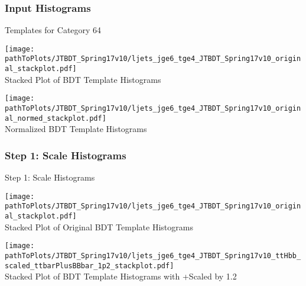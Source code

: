 \subsubsection{Input Histograms}
\begin{frame}{Templates for Category 64}

\begin{minipage}{0.48\textwidth}
\begin{center}
\texttt{[image: \\pathToPlots/JTBDT\_Spring17v10/ljets\_jge6\_tge4\_JTBDT\_Spring17v10\_original\_stackplot.pdf]}\label{fig::stackPlot64}\\
Stacked Plot of BDT Template Histograms

\end{center}
\end{minipage}
\begin{minipage}{0.48\textwidth}
\begin{center}
\texttt{[image: \\pathToPlots/JTBDT\_Spring17v10/ljets\_jge6\_tge4\_JTBDT\_Spring17v10\_original\_normed\_stackplot.pdf]}\label{fig::normed_stackPlot64}\\
Normalized BDT Template Histograms

\end{center}

\end{minipage}



\end{frame}

\subsubsection{Step 1: Scale Histograms}
\begin{frame}{Step 1: Scale Histograms}

\begin{minipage}{0.48\textwidth}
\begin{center}
\texttt{[image: \\pathToPlots/JTBDT\_Spring17v10/ljets\_jge6\_tge4\_JTBDT\_Spring17v10\_original\_stackplot.pdf]}\\
Stacked Plot of Original BDT Template Histograms
\label{fig::compare_stackPlot64}
\end{center}

\end{minipage}
\begin{minipage}{0.48\textwidth}
\begin{center}
\texttt{[image: \\pathToPlots/JTBDT\_Spring17v10/ljets\_jge6\_tge4\_JTBDT\_Spring17v10\_ttHbb\_scaled\_ttbarPlusBBbar\_1p2\_stackplot.pdf]}\\
Stacked Plot of BDT Template Histograms with \ttbar+\bbbar Scaled by \num[round-precision=1]{1.2}
\label{fig::compare_scaled_stackPlot64}
\end{center}

\end{minipage}




\end{frame}


